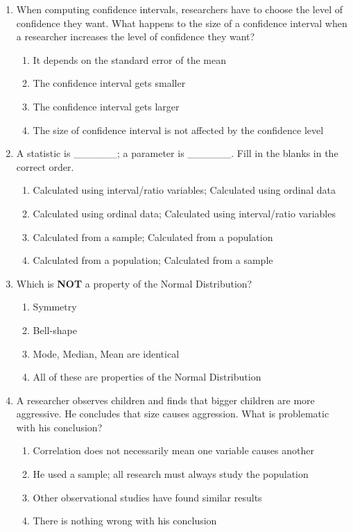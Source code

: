 \documentclass{article}
\begin{document}
\begin{enumerate}[label=\textbf{Q\arabic*:}]
    \item When computing confidence intervals, researchers have to choose the level of confidence they want. What happens to the size of a confidence interval when a researcher increases the level of confidence they want?
    \begin{enumerate}[label=\alph*)]
        \item It depends on the standard error of the mean
        \item The confidence interval gets smaller
        \item The confidence interval gets larger
        \item The size of confidence interval is not affected by the confidence level
    \end{enumerate}

    \item A statistic is \_\_\_\_\_\_; a parameter is \_\_\_\_\_\_. Fill in the blanks in the correct order.
    \begin{enumerate}[label=\alph*)]
        \item Calculated using interval/ratio variables; Calculated using ordinal data
        \item Calculated using ordinal data; Calculated using interval/ratio variables
        \item Calculated from a sample; Calculated from a population
        \item Calculated from a population; Calculated from a sample
    \end{enumerate}

    \item Which is \textbf{NOT} a property of the Normal Distribution?
    \begin{enumerate}[label=\alph*)]
        \item Symmetry
        \item Bell-shape
        \item Mode, Median, Mean are identical
        \item All of these are properties of the Normal Distribution
    \end{enumerate}

    \item A researcher observes children and finds that bigger children are more aggressive. He concludes that size causes aggression. What is problematic with his conclusion?
    \begin{enumerate}[label=\alph*)]
        \item Correlation does not necessarily mean one variable causes another
        \item He used a sample; all research must always study the population
        \item Other observational studies have found similar results
        \item There is nothing wrong with his conclusion
    \end{enumerate}


\end{enumerate}
\end{document}
